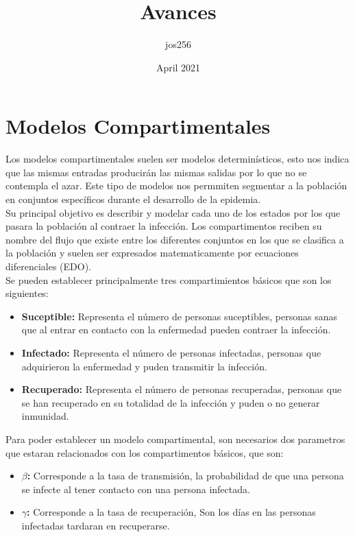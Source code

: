 \documentclass[a4paper,openany,12pt]{book}
\title{Avances}
\author{jos256 }
\date{April 2021}
\begin{document}
\chapter{Modelos Compartimentales}

Los modelos compartimentales suelen ser modelos determinísticos, esto nos indica que las mismas entradas producirán las mismas salidas por lo que no se contempla el azar. Este tipo de modelos nos permmiten segmentar a la población en conjuntos específicos durante el desarrollo de la epidemia.\\

Su principal objetivo es describir y modelar cada uno de los estados por los que pasara la población al contraer la infección.
Los compartimentos reciben su nombre del flujo que existe entre los diferentes conjuntos en los que se clasifica a la población y suelen ser expresados matematicamente por ecuaciones diferenciales (EDO).\\

Se pueden establecer principalmente tres compartimientos básicos que son los siguientes:\\

\begin{itemize}
\item \textbf{Suceptible:} Representa el número de personas suceptibles, personas sanas que al entrar en contacto con la enfermedad pueden contraer la infección.\\

\item \textbf{Infectado:} Representa el número de personas infectadas, personas que adquirieron la enfermedad y puden transmitir la infección.\\

\item \textbf{Recuperado:} Representa el número de personas recuperadas, personas que se han recuperado en su totalidad de la infección y puden o no generar inmunidad.
\end{itemize}

Para poder establecer un modelo compartimental, son necesarios dos parametros que estaran relacionados con los compartimentos básicos, que son: 

\begin{itemize}
\item \textbf{$\beta$:} Corresponde a la tasa de transmisión, la probabilidad de que una persona se infecte al tener contacto con una persona infectada.

\item \textbf{$\gamma$:} Corresponde a la tasa de recuperación, Son los días en las personas infectadas tardaran en recuperarse.

\end{itemize}
\end{document}
